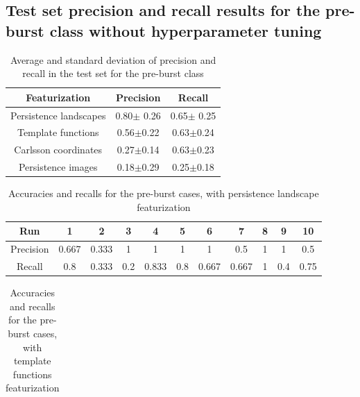 \documentclass{article}
\begin{document}
\begin{appendix}

\onecolumn
\section{Test set precision and recall results for the pre-burst class without hyperparameter tuning}

\begin{table}[h!]
\caption{Average and standard deviation of precision and recall in the test set for the pre-burst class}                 %
\label{precision-recall_standarddeviations}    %
\centering                        %
\begin{tabular}{c|c|c}
Featurization	&Precision &Recall	\\
\hline\hline

Persistence landscapes	&0.80$\pm$ 0.26 &0.65$\pm$ 0.25 	 \\
Template functions	&0.56$\pm$0.22	&0.63$\pm$0.24	 \\
Carlsson coordinates	&0.27$\pm$0.14	&0.63$\pm$0.23	 \\
Persistence images	&0.18$\pm$0.29	&0.25$\pm$0.18	 \\


\end{tabular}
\end{table}

\begin{table}[h!]
\caption{Accuracies and recalls for the pre-burst cases, with persistence landscape featurization}                 %
\label{recalls_accuracies_persistencelandscapes}    %
\centering                        %
\begin{tabular}{c|c|c|c|c|c|c|c|c|c|c}

Run&1&2&3&4&5&6&7&8&9&10\\
\hline\hline
Precision&0.667&0.333&1&1&1&1&0.5&1&1&0.5\\
\hline
Recall&0.8&0.333&0.2&0.833&0.8&0.667&0.667&1&0.4&0.75\\

\end{tabular}
\end{table} 

\begin{table}[h!]
\caption{Accuracies and recalls for the pre-burst cases, with template functions featurization}                 %
\label{recalls_accuracies_templatefunctions}    %
\centering                        %
\begin{tabular}{c|c|c|c|c|c|c|c|c|c|c}


\end{tabular}
\end{table}
\end{appendix}
\end{document}
